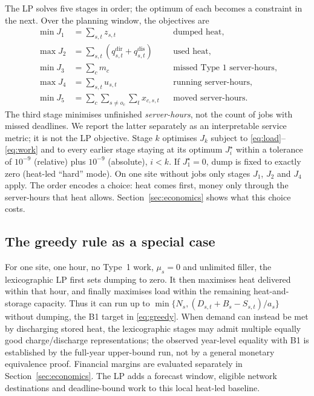 The LP solves five stages in order; the optimum of each becomes a constraint in the next.
Over the planning window, the objectives are
\begin{align*}
  \min J_1 &= \sum_{s,t}z_{s,t} &&\text{dumped heat},\\
  \max J_2 &= \sum_{s,t}(q^{\mathrm{dir}}_{s,t}+q^{\mathrm{dis}}_{s,t}) &&\text{used heat},\\
  \min J_3 &= \sum_c m_c &&\text{missed Type~1 server-hours},\\
  \max J_4 &= \sum_{s,t}u_{s,t} &&\text{running server-hours},\\
  \min J_5 &= \sum_c\sum_{s\ne o_c}\sum_t x_{c,s,t} &&\text{moved server-hours}.
\end{align*}
The third stage minimises unfinished \emph{server-hours}, not the count of jobs with missed
deadlines. We report the latter separately as an interpretable service metric; it is not
the LP objective. Stage $k$ optimises $J_k$ subject to \eqref{eq:load}--\eqref{eq:work} and to every earlier stage
staying at its optimum $J_i^\star$ within a tolerance of $10^{-9}$ (relative) plus $10^{-9}$
(absolute), $i < k$. If $J_1^\star = 0$, dump is fixed to exactly zero (heat-led ``hard'' mode).
On one site without jobs only stages $J_1$, $J_2$ and $J_4$ apply. The order encodes a choice: heat
comes first, money only through the server-hours that heat allows. Section~\ref{sec:economics}
shows what this choice costs.

\subsection{The greedy rule as a special case}

For one site, one hour, no Type~1 work, $\mu_s=0$ and unlimited filler, the lexicographic LP first
sets dumping to zero. It then maximises heat delivered within that hour, and finally maximises
load within the remaining heat-and-storage capacity. Thus it can run up to
$\min\{N_s,(D_{s,t}+B_s-S_{s,t})/a_s\}$ without dumping, the B1 target in
\eqref{eq:greedy}. When demand can instead be met by discharging stored heat, the
lexicographic stages may admit multiple equally good charge/discharge representations; the
observed year-level equality with B1 is established by the full-year upper-bound run, not by a
general monetary equivalence proof. Financial margins are evaluated separately in
Section~\ref{sec:economics}. The LP adds a forecast window, eligible network destinations and
deadline-bound work to this local heat-led baseline.

